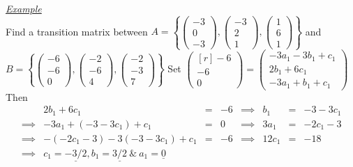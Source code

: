 \documentclass[11pt,a4paper]{article}
\begin{document}
\underline{\textit{Example}}\\
Find a transition matrix between $A = \left\{\begin{pmatrix} -3 \\ 0 \\ -3 \end{pmatrix}, \begin{pmatrix} -3 \\ 2 \\1 \end{pmatrix}, \begin{pmatrix} 1 \\ 6 \\ 1 \end{pmatrix} \right\}$ and $B = \left\{\begin{pmatrix} -6 \\ -6 \\ 0 \end{pmatrix}, \begin{pmatrix} -2 \\ -6 \\ 4 \end{pmatrix}, \begin{pmatrix} -2 \\ -3 \\ 7 \end{pmatrix} \right\}$
Set $\begin{pmatrix*}[r] -6 \\ -6 \\ 0 \end{pmatrix*} = \begin{pmatrix} -3a_1 -3b_1 + c_1 \\ 2b_1 + 6c_1 \\-3a_1 + b_1 + c_1 \end{pmatrix}$\\
Then \[\begin{array}{rrcrcccl}
  & 2b_1 + 6c_1 &=& -6 &\implies& b_1 &=& -3 -3c_1\\
  \implies& -3a_1 + (-3 -3c_1) + c_1 &=& 0 &\implies& 3a_1 &=& -2c_1 - 3\\
  \implies& -(-2c_1-3)-3(-3-3c_1)+c_1 &=& -6 &\implies& 12c_1 &=& -18\\
  \implies& c_1 = \underline{-3/2}, b_1 = \underline{3/2}\ \&\ a_1 = \underline{0}
\end{array}\]
\end{document}
